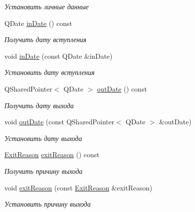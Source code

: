 \begin{DoxyCompactItemize}
\begin{DoxyCompactList}\small\item\em Установить личные данные \end{DoxyCompactList}\item 
Q\+Date \hyperlink{classkpk_1_1data_1_1_member_a94ae4a3def291913ce30f0e56f5211b3}{in\+Date} () const 
\begin{DoxyCompactList}\small\item\em Получить дату вступления \end{DoxyCompactList}\item 
void \hyperlink{classkpk_1_1data_1_1_member_a2bb634fd8da7526a8a4ca525c1b563c3}{in\+Date} (const Q\+Date \&in\+Date)
\begin{DoxyCompactList}\small\item\em Установить дату вступления \end{DoxyCompactList}\item 
Q\+Shared\+Pointer$<$ Q\+Date $>$ \hyperlink{classkpk_1_1data_1_1_member_ae8bacb7088f395e07899af07d1a3956d}{out\+Date} () const 
\begin{DoxyCompactList}\small\item\em Получить дату выхода \end{DoxyCompactList}\item 
void \hyperlink{classkpk_1_1data_1_1_member_ac578e1729285b7192d11759b46ae91ab}{out\+Date} (const Q\+Shared\+Pointer$<$ Q\+Date $>$ \&out\+Date)
\begin{DoxyCompactList}\small\item\em Установить дату выхода \end{DoxyCompactList}\item 
\hyperlink{namespacekpk_1_1data_a16790bc647a6788cab282e185ee28998}{Exit\+Reason} \hyperlink{classkpk_1_1data_1_1_member_afc92f22903dc9dfe70a4a83b6f203a06}{exit\+Reason} () const 
\begin{DoxyCompactList}\small\item\em Получить причину выхода \end{DoxyCompactList}\item 
void \hyperlink{classkpk_1_1data_1_1_member_afab382ccecb06ff6de6de4e5ffdded42}{exit\+Reason} (const \hyperlink{namespacekpk_1_1data_a16790bc647a6788cab282e185ee28998}{Exit\+Reason} \&exit\+Reason)
\begin{DoxyCompactList}\small\item\em Установить причину выхода \end{DoxyCompactList}\end{DoxyCompactItemize}

